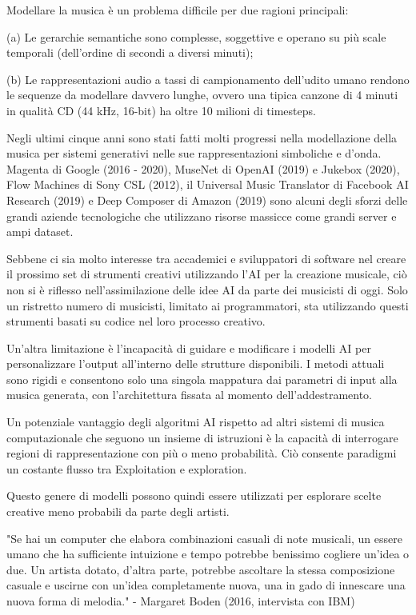 \documentclass[a4paper,12pt]{report}
\begin{document}
Modellare la musica è un problema difficile per due ragioni principali:

(a) Le gerarchie semantiche sono complesse, soggettive e operano su più scale temporali (dell'ordine di secondi a diversi minuti);

(b) Le rappresentazioni audio a tassi di campionamento dell'udito umano rendono le sequenze da modellare davvero lunghe, ovvero una tipica canzone di 4 minuti in qualità CD (44 kHz, 16-bit) ha oltre 10 milioni di timesteps.

Negli ultimi cinque anni sono stati fatti molti progressi nella modellazione della musica per sistemi generativi nelle sue rappresentazioni simboliche e d'onda. 
Magenta di Google (2016 - 2020), MuseNet di OpenAI (2019) e Jukebox (2020), Flow Machines di Sony CSL (2012), il Universal Music Translator di Facebook AI Research (2019) e Deep Composer di Amazon (2019)
sono alcuni degli sforzi delle grandi aziende tecnologiche che utilizzano risorse massicce come grandi server e ampi dataset. 

Sebbene ci sia molto interesse tra accademici e sviluppatori di software nel creare il prossimo set di strumenti creativi utilizzando l'AI per la creazione musicale, 
ciò non si è riflesso nell'assimilazione delle idee AI da parte dei musicisti di oggi. 
Solo un ristretto numero di musicisti, limitato ai programmatori, sta utilizzando questi strumenti basati su codice nel loro processo creativo.

Un'altra limitazione è l'incapacità di guidare e modificare i modelli AI per personalizzare l'output all'interno delle strutture disponibili. 
I metodi attuali sono rigidi e consentono solo una singola mappatura dai parametri di input alla musica generata, con l'architettura fissata al momento dell'addestramento. 

Un potenziale vantaggio degli algoritmi AI rispetto ad altri sistemi di musica computazionale che seguono un insieme di istruzioni è la capacità di interrogare regioni di rappresentazione con più o meno probabilità. 
Ciò consente paradigmi un costante flusso tra Exploitation e exploration. 

Questo genere di modelli possono quindi essere utilizzati per esplorare scelte creative meno probabili da parte degli artisti.

"Se hai un computer che elabora combinazioni casuali di note musicali, un essere umano che ha sufficiente intuizione e tempo potrebbe benissimo cogliere un'idea o due. 
Un artista dotato, d'altra parte, potrebbe ascoltare la stessa composizione casuale e uscirne con un'idea completamente nuova, una in gado di innescare una nuova forma di melodia."
- Margaret Boden (2016, intervista con IBM)
\end{document}
